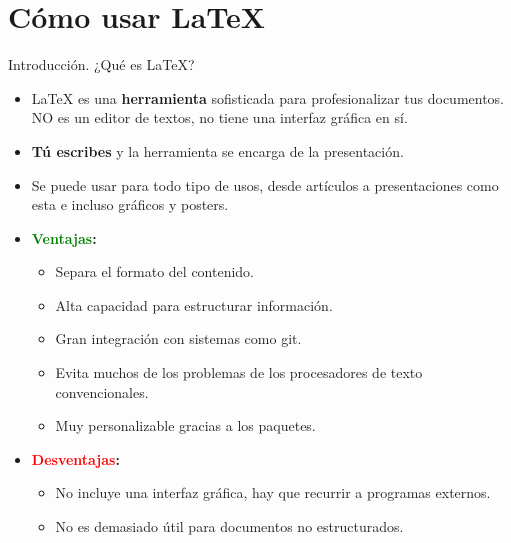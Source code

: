 \section{Cómo usar \LaTeX}

\begin{frame}{Introducción. ¿Qué es LaTeX?}
  \begin{itemize}
    \item \alert{\LaTeX{}} es una \textbf{herramienta} sofisticada para profesionalizar tus documentos. NO es un editor de textos, no tiene una interfaz gráfica en sí.
    \item \textbf{Tú escribes} y la herramienta se encarga de la presentación.
    \item Se puede usar para todo tipo de usos, desde artículos a presentaciones como esta e incluso gráficos y posters.
    \item \textbf{\textcolor{green}{Ventajas}:}
          \begin{itemize}
            \item Separa el formato del contenido.
            \item Alta capacidad para estructurar información.
            \item Gran integración con sistemas como git.
            \item Evita muchos de los problemas de los procesadores de texto convencionales. 
            \item Muy personalizable gracias a los paquetes.
          \end{itemize}
    \item \textbf{\textcolor{red}{Desventajas}:}
          \begin{itemize}
            \item No incluye una interfaz gráfica, hay que recurrir a programas externos.
            \item No es demasiado útil para documentos no estructurados.
          \end{itemize}
  \end{itemize}
\end{frame}

